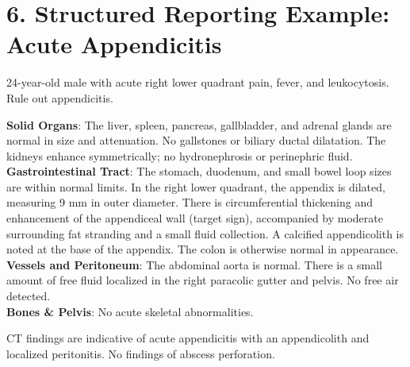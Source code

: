 \section*{6. Structured Reporting Example: Acute Appendicitis}

\begin{testbox}[Indications:]
24-year-old male with acute right lower quadrant pain, fever, and leukocytosis. Rule out appendicitis.
\end{testbox}
\begin{refbox}[Findings:]
\textbf{Solid Organs}: The liver, spleen, pancreas, gallbladder, and adrenal glands are normal in size and attenuation. No gallstones or biliary ductal dilatation. The kidneys enhance symmetrically; no hydronephrosis or perinephric fluid.\\
\textbf{Gastrointestinal Tract}: The stomach, duodenum, and small bowel loop sizes are within normal limits. In the right lower quadrant, the appendix is dilated, measuring 9 mm in outer diameter. There is circumferential thickening and enhancement of the appendiceal wall (target sign), accompanied by moderate surrounding fat stranding and a small fluid collection. A calcified appendicolith is noted at the base of the appendix. The colon is otherwise normal in appearance.\\
\textbf{Vessels and Peritoneum}: The abdominal aorta is normal. There is a small amount of free fluid localized in the right paracolic gutter and pelvis. No free air detected.\\
\textbf{Bones \& Pelvis}: No acute skeletal abnormalities.
\end{refbox}
\begin{pearlbox}[Impression:]
CT findings are indicative of acute appendicitis with an appendicolith and localized peritonitis. No findings of abscess perforation.
\end{pearlbox}

\clearpage

